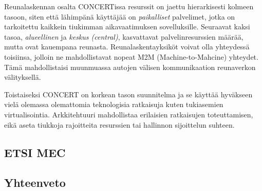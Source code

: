\documentclass[finnish]{tktltiki2}
\theoremstyle{definition}
\theoremstyle{remark}
\begin{document}
 Reunalaskennan osalta CONCERTissa resurssit on jaettu hierarkisesti kolmeen tasoon, siten että lähimpänä käyttäjää on \textit{paikalliset} palvelimet, jotka on tarkoitettu kaikkein tiukimman aikavaatimuksen sovelluksille. Seuraavat kaksi tasoa, \textit{alueellinen} ja \textit{keskus (central)}, kasvattavat palvelinresurssien määrää, mutta ovat kauempana reunasta. Reunalaskentayksiköt voivat olla yhteydessä toisiinsa, jolloin ne mahdollistavat nopeat M2M (Machine-to-Mahcine) yhteydet. Tämä mahdollistaisi muunmuassa autojen välisen kommunikaation reunaverkon välityksellä. 

Toistaiseksi CONCERT on korkean tason suunnitelma ja se käyttää hyväkseen vielä olemassa olemattomia teknologisia ratkaisuja kuten tukiasemien virtualisointia. Arkkitehtuuri mahdollistaa erilaisien ratkaisujen toteuttamisen, eikä aseta tiukkoja rajoitteita resurssien tai hallinnon sijoittelun suhteen.

\subsection{ETSI MEC}

\subsection{Yhteenveto}

 




\lastpage



% 
\end{document}
